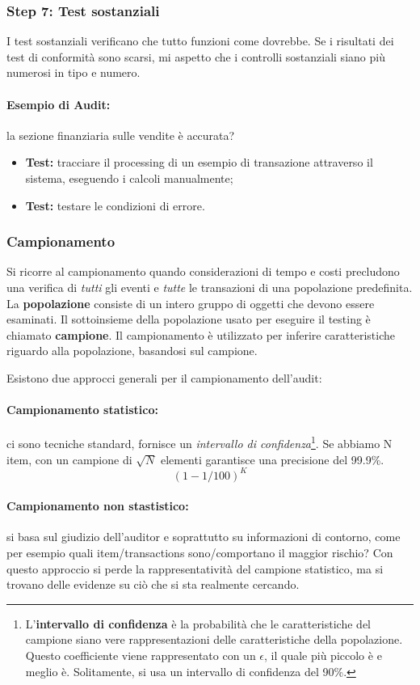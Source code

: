 \subsubsection{Step 7: Test sostanziali}
I test sostanziali verificano che tutto funzioni come dovrebbe.
Se i risultati dei test di conformità sono scarsi, mi aspetto che i controlli
sostanziali siano più numerosi in tipo e numero.

\paragraph*{Esempio di Audit:} la sezione finanziaria sulle vendite è accurata?

\begin{itemize}
\item \textbf{Test:} tracciare il processing di un esempio di transazione
attraverso il sistema, eseguendo i calcoli manualmente;
\item \textbf{Test:} testare le condizioni di errore.
\end{itemize}


\subsubsection{Campionamento}
Si ricorre al campionamento quando considerazioni di tempo e costi
precludono una verifica di \emph{tutti} gli eventi e
\emph{tutte} le transazioni di una popolazione predefinita.
La \textbf{popolazione} consiste di un intero gruppo di oggetti
che devono essere esaminati.
Il sottoinsieme della popolazione usato per
eseguire il testing è chiamato \textbf{campione}. Il campionamento
è utilizzato per inferire caratteristiche riguardo alla popolazione,
basandosi sul campione.

Esistono due approcci generali per il campionamento dell'audit:
\paragraph*{Campionamento statistico:} ci sono tecniche standard, fornisce un
\textit{intervallo di confidenza}\footnote{L'\textbf{intervallo
di confidenza} è la probabilità che le caratteristiche del
campione siano vere rappresentazioni delle caratteristiche della
popolazione. Questo coefficiente viene rappresentato con un $\epsilon$,
il quale più piccolo è e meglio è. Solitamente, si usa un intervallo di
confidenza del 90\%.}. Se abbiamo N item, con un campione di
$\sqrt{N}$ elementi garantisce una precisione del 99.9\%.
$$
(1 - 1/100)^K
$$
\paragraph*{Campionamento non stastistico:} si basa sul giudizio
dell'auditor e soprattutto su informazioni di contorno, come per
esempio quali item/transactions sono/comportano il maggior rischio?
Con questo approccio si perde la rappresentatività
del campione statistico, ma si trovano delle evidenze su ciò che
si sta realmente cercando.
